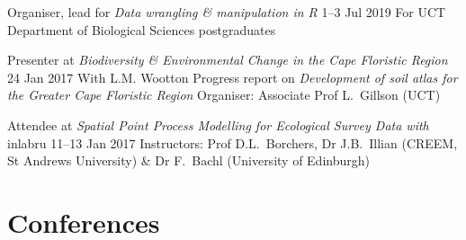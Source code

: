 \documentclass[10pt]{article}
\begin{document}
\begin{hangparas}{2em}{1}

Organiser, lead for \textit{Data wrangling \& manipulation in R}
                                                     \hfill 1--3 Jul 2019 \break
For UCT Department of Biological Sciences postgraduates

Presenter at \textit{Biodiversity \& Environmental Change in the Cape 
Floristic Region}                                      \hfill 24 Jan 2017 \break
With L.M. Wootton                                                         \break
Progress report on \textit{Development of soil atlas for the 
Greater Cape Floristic Region}                                            \break
Organiser: Associate Prof L.~Gillson (UCT)

Attendee at \textit{Spatial Point Process Modelling for Ecological 
Survey Data with} inlabru                          \hfill 11--13 Jan 2017 \break
Instructors:
  Prof D.L.~Borchers,
  Dr J.B.~Illian (CREEM, St Andrews University)                           \break
  \& Dr F.~Bachl (University of Edinburgh)

\hfill

\end{hangparas}

\clearpage %

\section*{Conferences} %
\end{document}
